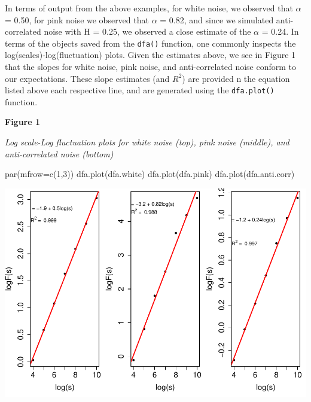 \documentclass[
  man]{apa6}
\newenvironment{Shaded}{\begin{snugshade}}{\end{snugshade}}
\newcommand{\AttributeTok}[1]{\textcolor[rgb]{0.77,0.63,0.00}{#1}}
\newcommand{\DecValTok}[1]{\textcolor[rgb]{0.00,0.00,0.81}{#1}}
\newcommand{\FunctionTok}[1]{\textcolor[rgb]{0.00,0.00,0.00}{#1}}
\newcommand{\NormalTok}[1]{#1}
\begin{document}
In terms of output from the above examples, for white noise, we observed
that \(\alpha\) = 0.50, for pink noise we observed that
\(\alpha\) = 0.82, and since we simulated anti-correlated
noise with H = 0.25, we observed a close estimate of the \(\alpha\) =
0.24. In terms of the objects saved from the \texttt{dfa()}
function, one commonly inspects the log(scales)-log(fluctuation) plots.
Given the estimates above, we see in Figure 1 that the slopes for white
noise, pink noise, and anti-correlated noise conform to our
expectations. These slope estimates (and \(R^2\)) are provided n the
equation listed above each respective line, and are generated using the
\texttt{dfa.plot()} function.

\textbf{Figure 1}

\emph{Log scale-Log fluctuation plots for white noise (top), pink noise
(middle), and anti-correlated noise (bottom)}

\begin{Shaded}
\begin{Highlighting}[]
\FunctionTok{par}\NormalTok{(}\AttributeTok{mfrow=}\FunctionTok{c}\NormalTok{(}\DecValTok{1}\NormalTok{,}\DecValTok{3}\NormalTok{))}
\FunctionTok{dfa.plot}\NormalTok{(dfa.white)}
\FunctionTok{dfa.plot}\NormalTok{(dfa.pink)}
\FunctionTok{dfa.plot}\NormalTok{(dfa.anti.corr)}
\end{Highlighting}
\end{Shaded}

\includegraphics{fractal_regression_paper_brm_files/figure-latex/unnamed-chunk-3-1.pdf}
\end{document}
